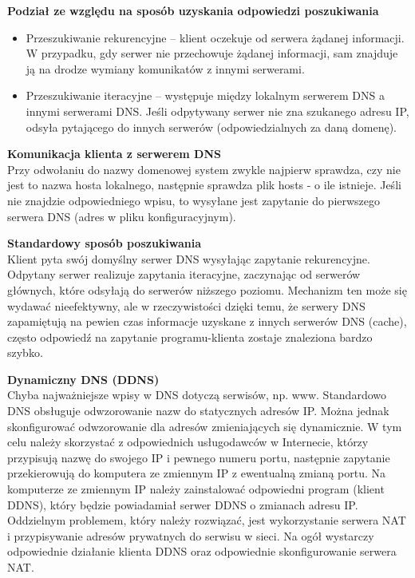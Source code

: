 \documentclass[a4paper]{article}
\begin{document}
\textbf{Podział ze względu na sposób uzyskania odpowiedzi poszukiwania}
\begin{itemize}
    \item Przeszukiwanie rekurencyjne – klient oczekuje od serwera żądanej informacji. W przypadku,
gdy serwer nie przechowuje żądanej informacji, sam znajduje ją na drodze wymiany
komunikatów z innymi serwerami.
    \item  Przeszukiwanie iteracyjne – występuje między lokalnym serwerem DNS a innymi serwerami
DNS. Jeśli odpytywany serwer nie zna szukanego adresu IP, odsyła pytającego do innych
serwerów (odpowiedzialnych za daną domenę).
\end{itemize}

\textbf{Komunikacja klienta z serwerem DNS}\\
Przy odwołaniu do nazwy domenowej system zwykle najpierw sprawdza, czy nie jest to
nazwa hosta lokalnego, następnie sprawdza plik hosts - o ile istnieje. Jeśli nie znajdzie odpowiedniego wpisu, to
wysyłane jest zapytanie do pierwszego serwera DNS (adres w pliku
konfiguracyjnym). 

\textbf{Standardowy sposób poszukiwania}\\
Klient pyta swój domyślny serwer DNS wysyłając zapytanie rekurencyjne.
Odpytany serwer realizuje zapytania iteracyjne, zaczynając od serwerów głównych, które
odsyłają do serwerów niższego poziomu.
Mechanizm ten może się wydawać nieefektywny, ale w rzeczywistości dzięki temu, że
serwery DNS zapamiętują na pewien czas informacje uzyskane z innych serwerów DNS
(cache), często odpowiedź na zapytanie programu-klienta zostaje znaleziona bardzo szybko.

\textbf{Dynamiczny DNS (DDNS)}\\
Chyba najważniejsze wpisy w DNS dotyczą serwisów, np. www. Standardowo DNS obsługuje
odwzorowanie nazw do statycznych adresów IP. Można jednak skonfigurować odwzorowanie dla adresów zmieniających się
dynamicznie. W tym celu należy skorzystać z odpowiednich usługodawców w Internecie,
którzy przypisują nazwę do swojego IP i pewnego numeru portu, następnie zapytanie
przekierowują do komputera ze zmiennym IP z ewentualną zmianą portu. Na komputerze ze zmiennym IP należy
zainstalować odpowiedni program (klient DDNS), który będzie powiadamiał serwer DDNS o
zmianach adresu IP.
Oddzielnym problemem, który należy rozwiązać, jest wykorzystanie serwera NAT i
przypisywanie adresów prywatnych do serwisu w sieci. Na ogół wystarczy odpowiednie
działanie klienta DDNS oraz odpowiednie skonfigurowanie serwera NAT.
\end{document}
